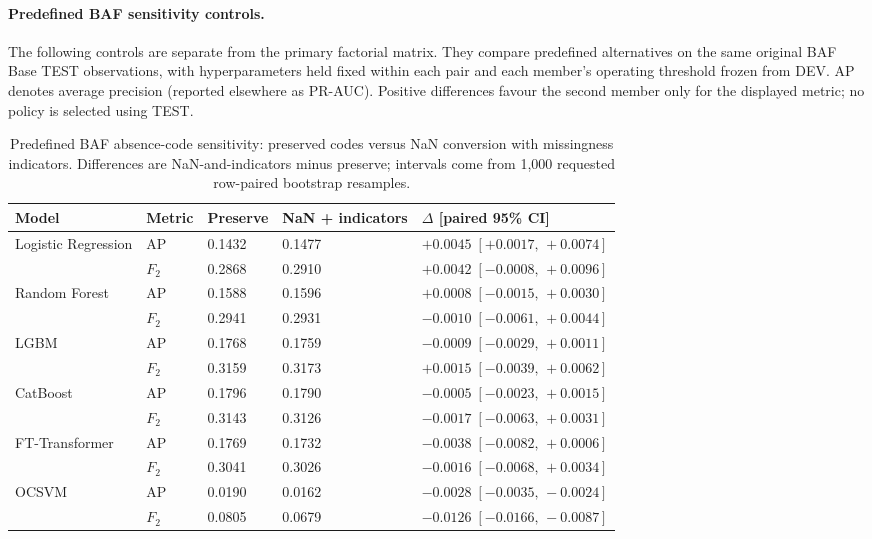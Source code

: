 \paragraph{Predefined BAF sensitivity controls.}
The following controls are separate from the primary factorial matrix. They compare predefined alternatives on the same original BAF Base TEST observations, with hyperparameters held fixed within each pair and each member's operating threshold frozen from DEV. AP denotes average precision (reported elsewhere as PR-AUC). Positive differences favour the second member only for the displayed metric; no policy is selected using TEST.

\begin{table}[htbp]
\centering
\caption{Predefined BAF absence-code sensitivity: preserved codes versus NaN conversion with missingness indicators. Differences are NaN-and-indicators minus preserve; intervals come from 1,000 requested row-paired bootstrap resamples.}
\label{tab:baf_missingness_sensitivity}
\begingroup\small
\setlength{\tabcolsep}{3pt}
\renewcommand{\arraystretch}{1.12}
\begin{tabular}{@{}p{26mm}p{12mm}p{18mm}p{23mm}p{55mm}@{}}
\toprule
Model & Metric & Preserve & NaN + indicators & $\Delta$ [paired 95\% CI] \\
\midrule
Logistic Regression & AP & 0.1432 & 0.1477 & $+0.0045\;[+0.0017,\,+0.0074]$ \\
 & $F_2$ & 0.2868 & 0.2910 & $+0.0042\;[-0.0008,\,+0.0096]$ \\
\addlinespace[3pt]
Random Forest & AP & 0.1588 & 0.1596 & $+0.0008\;[-0.0015,\,+0.0030]$ \\
 & $F_2$ & 0.2941 & 0.2931 & $-0.0010\;[-0.0061,\,+0.0044]$ \\
\addlinespace[3pt]
LGBM & AP & 0.1768 & 0.1759 & $-0.0009\;[-0.0029,\,+0.0011]$ \\
 & $F_2$ & 0.3159 & 0.3173 & $+0.0015\;[-0.0039,\,+0.0062]$ \\
\addlinespace[3pt]
CatBoost & AP & 0.1796 & 0.1790 & $-0.0005\;[-0.0023,\,+0.0015]$ \\
 & $F_2$ & 0.3143 & 0.3126 & $-0.0017\;[-0.0063,\,+0.0031]$ \\
\addlinespace[3pt]
FT-Transformer & AP & 0.1769 & 0.1732 & $-0.0038\;[-0.0082,\,+0.0006]$ \\
 & $F_2$ & 0.3041 & 0.3026 & $-0.0016\;[-0.0068,\,+0.0034]$ \\
\addlinespace[3pt]
OCSVM & AP & 0.0190 & 0.0162 & $-0.0028\;[-0.0035,\,-0.0024]$ \\
 & $F_2$ & 0.0805 & 0.0679 & $-0.0126\;[-0.0166,\,-0.0087]$ \\
\bottomrule
\end{tabular}
\endgroup
\end{table}

